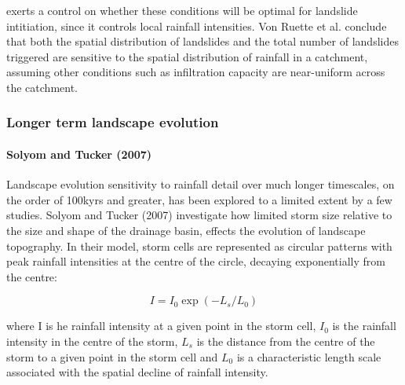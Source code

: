 \documentclass[12pt,oneside,PhD]{muthesis}
\begin{document}
exerts a control on whether these conditions will be optimal for landslide intitiation, since it controls local rainfall intensities. Von Ruette et al. conclude that both the spatial distribution of landslides and the total number of landslides triggered are sensitive to the spatial distribution of rainfall in a catchment, assuming other conditions such as infiltration capacity are near-uniform across the catchment.

\subsubsection{Longer term landscape evolution}

\paragraph{Solyom and Tucker (2007)}
Landscape evolution sensitivity to rainfall detail over much longer timescales, on the order of 100kyrs and greater, has been explored to a limited extent by a few studies. Solyom and Tucker (2007) investigate how limited storm size relative to the size and shape of the drainage basin, effects the evolution of landscape topography. In their model, storm cells are represented as circular patterns with peak rainfall intensities at the centre of the circle, decaying exponentially from the centre:

\begin{equation}
I = I_0 \exp(-L_s/L_0)
\end{equation}

where I is he rainfall intensity at a given point in the storm cell, \(I_0\) is the rainfall intensity in the centre of the storm, \(L_s\) is the distance from the centre of the storm to a given point in the storm cell and \(L_0\) is a characteristic length scale associated with the spatial decline of rainfall intensity.
\end{document}

